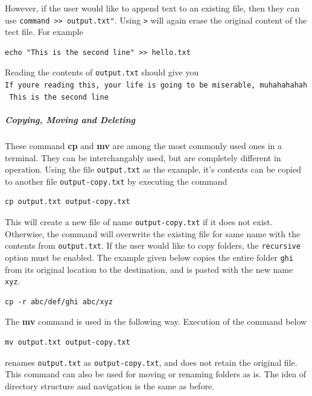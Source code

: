 \documentclass[11pt]{article}
\begin{document}
However, if the user would like to append text to an existing file, then
they can use
\texttt{command\ \textgreater{}\textgreater{}\ output.txt"}. Using
\texttt{\textgreater{}} will again erase the original content of the
tect file. For example

\begin{verbatim}
echo "This is the second line" >> hello.txt
\end{verbatim}

Reading the contents of \texttt{output.txt} should give you
\texttt{If\ you\textquotesingle{}re\ reading\ this,\ your\ life\ is\ going\ to\ be\ miserable,\ muhahahahah\ This\ is\ the\ second\ line}

    \subparagraph{Copying, Moving and
Deleting}\label{copying-moving-and-deleting}

These command \textbf{cp} and \textbf{mv} are among the most commonly
used ones in a terminal. They can be interchangably used, but are
completely different in operation. Using the file \texttt{output.txt} as
the example, it's contents can be copied to another file
\texttt{output-copy.txt} by executing the command

\begin{verbatim}
cp output.txt output-copy.txt
\end{verbatim}

This will create a new file of name \texttt{output-copy.txt} if it does
not exist. Otherwise, the command will overwrite the existing file for
same name with the contents from \texttt{output.txt}. If the user would
like to copy folders, the \texttt{recursive} option must be enabled. The
example given below copies the entire folder \texttt{ghi} from its
original location to the destination, and is pasted with the new name
\texttt{xyz}.

\begin{verbatim}
cp -r abc/def/ghi abc/xyz
\end{verbatim}

The \textbf{mv} command is used in the following way. Execution of the
command below

\begin{verbatim}
mv output.txt output-copy.txt
\end{verbatim}

renames \texttt{output.txt} as \texttt{output-copy.txt}, and does not
retain the original file. This command can also be used for moving or
renaming folders as is. The idea of directory structure and navigation
is the same as before.
\end{document}
